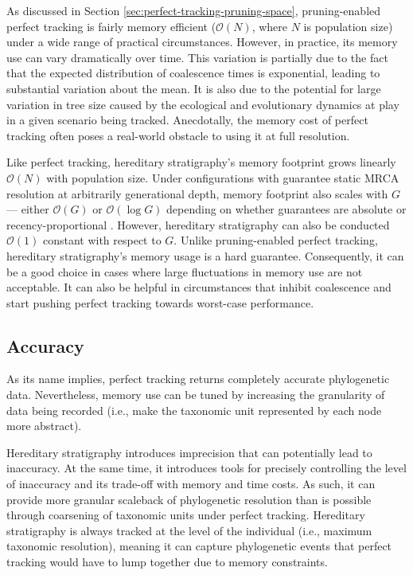 As discussed in Section \ref{sec:perfect-tracking-pruning-space}, pruning-enabled perfect tracking is fairly memory efficient ($\mathcal{O}(N)$, where $N$ is population size) under a wide range of practical circumstances.
However, in practice, its memory use can vary dramatically over time.
This variation is partially due to the fact that the expected distribution of coalescence times is exponential, leading to substantial variation about the mean.
It is also due to the potential for large variation in tree size caused by the ecological and evolutionary dynamics at play in a given scenario being tracked.
Anecdotally, the memory cost of perfect tracking often poses a real-world obstacle to using it at full resolution.

Like perfect tracking, hereditary stratigraphy's memory footprint grows linearly $\mathcal{O}(N)$ with population size.
Under configurations with guarantee static MRCA resolution at arbitrarily generational depth, memory footprint also scales with $G$ --- either $\mathcal{O}(G)$ or $\mathcal{O}(\log G)$ depending on whether guarantees are absolute or recency-proportional \citep{OTHERPREPRINT}.  %
However, hereditary stratigraphy can also be conducted $\mathcal{O}(1)$ constant with respect to $G$.
Unlike pruning-enabled perfect tracking, hereditary stratigraphy's memory usage is a hard guarantee.
Consequently, it can be a good choice in cases where large fluctuations in memory use are not acceptable.
It can also be helpful in circumstances that inhibit coalescence and start pushing perfect tracking towards worst-case performance.

\subsection{Accuracy}

As its name implies, perfect tracking returns completely accurate phylogenetic data.
Nevertheless, memory use can be tuned by increasing the granularity of data being recorded (i.e., make the taxonomic unit represented by each node more abstract).

Hereditary stratigraphy introduces imprecision that can potentially lead to inaccuracy.
At the same time, it introduces tools for precisely controlling the level of inaccuracy and its trade-off with memory and time costs.
As such, it can provide more granular scaleback of phylogenetic resolution than is possible through coarsening of taxonomic units under perfect tracking.
Hereditary stratigraphy is always tracked at the level of the individual (i.e., maximum taxonomic resolution), meaning it can capture phylogenetic events that perfect tracking would have to lump together due to memory constraints.

